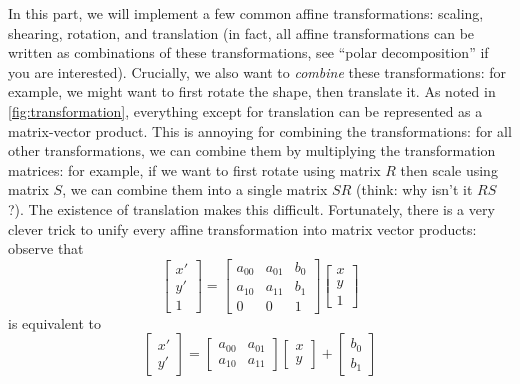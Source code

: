 In this part, we will implement a few common affine transformations: scaling, shearing, rotation, and translation (in fact, all affine transformations can be written as combinations of these transformations, see ``polar decomposition'' if you are interested). Crucially, we also want to \emph{combine} these transformations: for example, we might want to first rotate the shape, then translate it. As noted in \cref{fig:transformation}, everything except for translation can be represented as a matrix-vector product. This is annoying for combining the transformations: for all other transformations, we can combine them by multiplying the transformation matrices: for example, if we want to first rotate using matrix $R$ then scale using matrix $S$, we can combine them into a single matrix $S R$ (think: why isn't it $R S$?). The existence of translation makes this difficult. Fortunately, there is a very clever trick to unify every affine transformation into matrix vector products: observe that
\begin{equation}
\begin{bmatrix}
x' \\ y' \\ 1
\end{bmatrix}
=
\begin{bmatrix}
a_{00} & a_{01} & b_{0} \\
a_{10} & a_{11} & b_{1} \\
0 & 0 & 1
\end{bmatrix}
\begin{bmatrix}
x \\ y \\ 1
\end{bmatrix}
\end{equation}
is equivalent to
\begin{equation}
\begin{bmatrix}
x' \\ y'
\end{bmatrix}
=
\begin{bmatrix}
a_{00} & a_{01} \\
a_{10} & a_{11}
\end{bmatrix}
\begin{bmatrix}
x \\ y
\end{bmatrix}
+
\begin{bmatrix}
b_0 \\ b_1
\end{bmatrix}
\end{equation}

